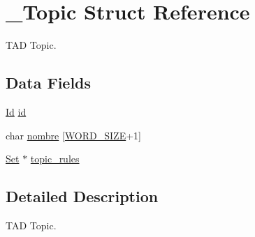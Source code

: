\hypertarget{struct___topic}{\section{\+\_\+\+Topic Struct Reference}
\label{struct___topic}
}


T\+A\+D Topic.  


\subsection*{Data Fields}
\begin{DoxyCompactItemize}
\item 
\hyperlink{_types_8h_a845e604fb28f7e3d97549da3448149d3}{Id} \hyperlink{struct___topic_a150a709e86e7134d17cd063de6810b6c}{id}
\item 
char \hyperlink{struct___topic_a40587fabbfdf0996985f447b11a53856}{nombre} \mbox{[}\hyperlink{_types_8h_a92ed8507d1cd2331ad09275c5c4c1c89}{W\+O\+R\+D\+\_\+\+S\+I\+Z\+E}+1\mbox{]}
\item 
\hyperlink{_set_8h_a6d3b7f7c92cbb4577ef3ef7ddbf93161}{Set} $\ast$ \hyperlink{struct___topic_a6faf8080053d28b9a70b08fad369b396}{topic\+\_\+rules}
\end{DoxyCompactItemize}


\subsection{Detailed Description}
T\+A\+D Topic. 


\begin{DoxyItemize}
\item 
\end{DoxyItemize}

